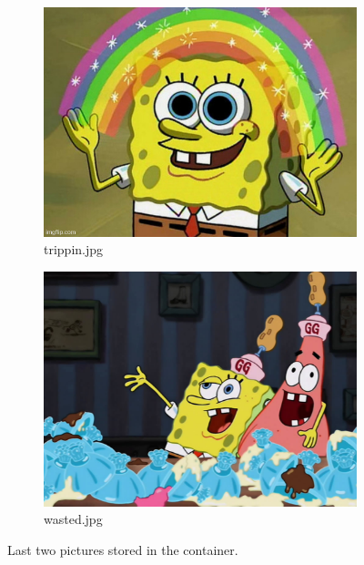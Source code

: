 \documentclass[12pt]{article}
\begin{document}
\begin{figure}[H]
     \centering
     \begin{subfigure}[b]{0.46\textwidth}
         \centering
         \includegraphics[width=\textwidth]{images/trippin.jpg}
         \caption{trippin.jpg}
         \label{fig:trippin}
     \end{subfigure}
     \begin{subfigure}[b]{0.45\textwidth}
         \centering
         \includegraphics[width=\textwidth]{images/wasted.jpg}
         \caption{wasted.jpg}
         \label{fig:wasted}
     \end{subfigure}
     \caption{Last two pictures stored in the container.}
\end{figure}
\end{document}
